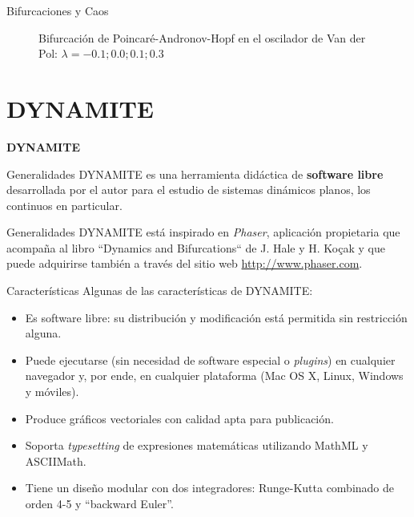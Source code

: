 \documentclass{beamer}
\newcommand{\stframe}[1]{\begin{frame} \begin{center}\Large{\textbf{{#1}}}\end{center}\end{frame}}
\begin{document}
\begin{frame}{Bifurcaciones y Caos}
\begin{figure}[!ht]
	\caption{Bifurcación de Poincaré-Andronov-Hopf en el oscilador de Van der Pol: $\lambda=-0.1;  0.0; 0.1; 0.3$}
\end{figure}
\end{frame}

\section{DYNAMITE}
\stframe{DYNAMITE}
\begin{frame}{Generalidades}
DYNAMITE es una herramienta didáctica de \textbf{software libre} desarrollada por el autor para el estudio de sistemas dinámicos planos, los continuos en particular.
\end{frame}

\begin{frame}{Generalidades}
DYNAMITE está inspirado en \textit{Phaser}, aplicación propietaria que acompaña al libro ``Dynamics and Bifurcations`` de J. Hale y H. Ko\c{c}ak y que puede adquirirse también a través del sitio web \url{http://www.phaser.com}.
\end{frame}

\begin{frame}{Características}
Algunas de las características de DYNAMITE:

	\begin{itemize}
		\pause
		\item Es software libre: su distribución y modificación está permitida sin restricción alguna.
		\pause
		\item Puede ejecutarse (sin necesidad de software especial o \textit{plugins}) en cualquier navegador y, por ende, en cualquier plataforma (Mac OS X, Linux, Windows y móviles).
		\pause
		\item Produce gráficos vectoriales con calidad apta para publicación.
		\pause
		\item Soporta \textit{typesetting} de expresiones matemáticas utilizando MathML y ASCIIMath.
		\pause
		\item Tiene un diseño modular con dos integradores: Runge-Kutta combinado de orden 4-5 y ``backward Euler''.
	\end{itemize}
\end{frame}
\end{document}
